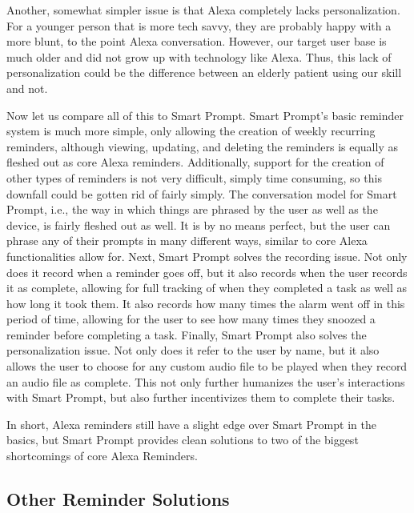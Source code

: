 \documentclass[11pt, oneside]{article}
\begin{document}
Another, somewhat simpler issue is that Alexa completely lacks personalization. 
For a younger person that is more tech savvy, they are probably happy with a more blunt, to the point Alexa conversation. 
However, our target user base is much older and did not grow up with technology like Alexa. 
Thus, this lack of personalization could be the difference between an elderly patient using our skill and not. 

Now let us compare all of this to Smart Prompt. 
Smart Prompt's basic reminder system is much more simple, only allowing the creation of weekly recurring reminders, although viewing, updating, and deleting the reminders is equally as fleshed out as core Alexa reminders. 
Additionally, support for the creation of other types of reminders is not very difficult, simply time consuming, so this downfall could be gotten rid of fairly simply. 
The conversation model for Smart Prompt, i.e., the way in which things are phrased by the user as well as the device, is fairly fleshed out as well. 
It is by no means perfect, but the user can phrase any of their prompts in many different ways, similar to core Alexa functionalities allow for. 
Next, Smart Prompt solves the recording issue. 
Not only does it record when a reminder goes off, but it also records when the user records it as complete, allowing for full tracking of when they completed a task as well as how long it took them. 
It also records how many times the alarm went off in this period of time, allowing for the user to see how many times they snoozed a reminder before completing a task. 
Finally, Smart Prompt also solves the personalization issue. 
Not only does it refer to the user by name, but it also allows the user to choose for any custom audio file to be played when they record an audio file as complete. 
This not only further humanizes the user's interactions with Smart Prompt, but also further incentivizes them to complete their tasks. 

In short, Alexa reminders still have a slight edge over Smart Prompt in the basics, but Smart Prompt provides clean solutions to two of the biggest shortcomings of core Alexa Reminders. 

\subsection{Other Reminder Solutions}
\end{document}

